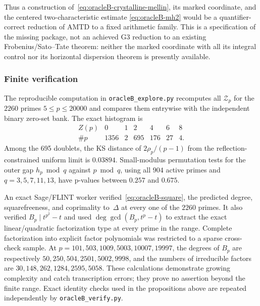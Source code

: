 Thus a construction of~\eqref{eq:oracleB-crystalline-mellin}, its marked
coordinate, and the centered two-characteristic estimate
\eqref{eq:oracleB-mh2} would be a quantifier-correct reduction of AMTD to a
fixed arithmetic family.  This is a specification of the missing package,
not an achieved G3 reduction to an existing Frobenius/Sato--Tate theorem:
neither the marked coordinate with all its integral control nor its
horizontal dispersion theorem is presently available.

\subsubsection{Finite verification}

The reproducible computation in \texttt{oracleB\_explore.py} recomputes
all $\mathcal Z_p$ for the $2260$ primes $5\leq p\leq20000$ and compares
them entrywise with the independent binary zero-set bank.  The exact
histogram is
\[
\begin{array}{c|rrrrrr}
 Z(p)&0&1&2&4&6&8\\ \hline
 \#p&1356&2&695&176&27&4.
\end{array}
\]
Among the 695 doublets, the KS distance of
$2\rho_p/(p-1)$ from the reflection-constrained uniform limit is
$0.03894$.  Small-modulus permutation tests for the outer gap
$h_p\bmod q$ against $p\bmod q$, using all $904$ active primes and
$q=3,5,7,11,13$, have p-values between $0.257$ and $0.675$.

An exact Sage/FLINT worker verified~\eqref{eq:oracleB-square}, the predicted
degree, squarefreeness, and coprimality to~$\Delta$ at every one of the
$2260$ primes.  It also verified $B_p\mid t^{p^2}-t$ and used
$\deg\gcd(B_p,t^p-t)$ to extract the exact linear/quadratic factorization
type at every prime in the range.  Complete factorization into explicit
factor polynomials was restricted to a sparse cross-check sample.
At $p=101,503,1009,5003,10007,19997$, the degrees of $B_p$ are respectively
$50,250,504,2501,5002,9998$, and the numbers of irreducible factors are
$30,148,262,1284,2595,5058$.  These calculations demonstrate growing
complexity and catch transcription errors; they prove no assertion beyond
the finite range.  Exact identity checks used in the propositions above are
repeated independently by \texttt{oracleB\_verify.py}.

